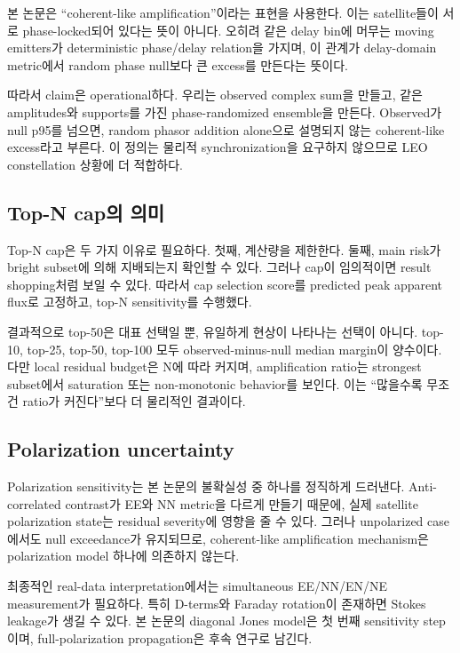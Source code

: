 \documentclass[11pt,a4paper]{article}
\begin{document}
본 논문은 ``coherent-like amplification''이라는 표현을 사용한다.
이는 satellite들이 서로 phase-locked되어 있다는 뜻이 아니다.
오히려 같은 delay bin에 머무는 moving emitters가 deterministic phase/delay relation을 가지며, 이 관계가 delay-domain metric에서 random phase null보다 큰 excess를 만든다는 뜻이다.

따라서 claim은 operational하다.
우리는 observed complex sum을 만들고, 같은 amplitudes와 supports를 가진 phase-randomized ensemble을 만든다.
Observed가 null p95를 넘으면, random phasor addition alone으로 설명되지 않는 coherent-like excess라고 부른다.
이 정의는 물리적 synchronization을 요구하지 않으므로 LEO constellation 상황에 더 적합하다.

\subsection{Top-N cap의 의미}

Top-N cap은 두 가지 이유로 필요하다.
첫째, 계산량을 제한한다.
둘째, main risk가 bright subset에 의해 지배되는지 확인할 수 있다.
그러나 cap이 임의적이면 result shopping처럼 보일 수 있다.
따라서 cap selection score를 predicted peak apparent flux로 고정하고, top-N sensitivity를 수행했다.

결과적으로 top-50은 대표 선택일 뿐, 유일하게 현상이 나타나는 선택이 아니다.
top-10, top-25, top-50, top-100 모두 observed-minus-null median margin이 양수이다.
다만 local residual budget은 N에 따라 커지며, amplification ratio는 strongest subset에서 saturation 또는 non-monotonic behavior를 보인다.
이는 ``많을수록 무조건 ratio가 커진다''보다 더 물리적인 결과이다.

\subsection{Polarization uncertainty}

Polarization sensitivity는 본 논문의 불확실성 중 하나를 정직하게 드러낸다.
Anti-correlated contrast가 EE와 NN metric을 다르게 만들기 때문에, 실제 satellite polarization state는 residual severity에 영향을 줄 수 있다.
그러나 unpolarized case에서도 null exceedance가 유지되므로, coherent-like amplification mechanism은 polarization model 하나에 의존하지 않는다.

최종적인 real-data interpretation에서는 simultaneous EE/NN/EN/NE measurement가 필요하다.
특히 D-terms와 Faraday rotation이 존재하면 Stokes leakage가 생길 수 있다.
본 논문의 diagonal Jones model은 첫 번째 sensitivity step이며, full-polarization propagation은 후속 연구로 남긴다.
\end{document}
